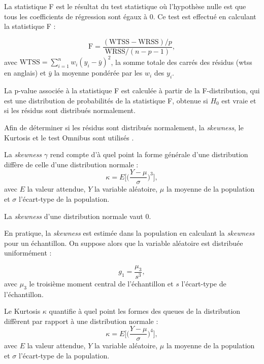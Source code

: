 La statistique F est le résultat du test statistique où l'hypothèse nulle est que tous les coefficients de régression sont égaux à 0. Ce test est effectué en calculant 
la statistique F \citep{James2013} :

\begin{equation}
\label{eq:factors_statistic_F}
\text{F} = \frac{ (\text{WTSS} - \text{WRSS}) / p }{ \text{WRSS} /(n - p - 1) }, 
\end{equation}
avec $\text{WTSS} = \sum_{i=1}^{n} w_i(y_i - \bar{y})^2$, la somme totale des carrés des résidus (\gls{wtss} en anglais) et $\bar{y}$ la moyenne 
pondérée par les $w_i$ des $y_i$. 

La p-value associée à la statistique F est calculée à partir de la F-distribution, qui est une distribution de probabilités de la statistique F, obtenue si $H_{0}$ 
est vraie et si les résidus sont distribués normalement.

Afin de déterminer si les résidus sont distribués normalement, la \textit{skewness}, le Kurtosis et le test Omnibus sont utilisés \citep{dagostino1973, dagostino1971, Bowman1975}.

La \textit{skewness} $\gamma$ rend compte d'à quel point la forme générale d'une distribution diffère de celle d'une distribution normale : 
\begin{equation}
\label{eq:factors_skewness}
\kappa = E \Big[ \Big(\frac{ Y - \mu }{ \sigma }\Big)^{3} \Big], 
\end{equation}
avec $E$ la valeur attendue, $Y$ la variable aléatoire, $\mu$ la moyenne de la population et $\sigma$ l'écart-type de la population.

La \textit{skewness} d'une distribution normale vaut 0.

En pratique, la \textit{skewness} est estimée dans la population en calculant la \textit{skewness} pour un échantillon. On suppose alors
que la variable aléatoire est distribuée uniformément :

\begin{equation}
\label{eq:factors_skewness_estimation}
g_{1} = \frac{ \mu_{3} } {s^3},
\end{equation}
avec $\mu_{3}$ le troisième moment central de l'échantillon et $s$ l'écart-type de l'échantillon.

Le Kurtosis $\kappa$ quantifie à quel point les formes des queues de la distribution diffèrent par rapport à une distribution normale :
\begin{equation}
\label{eq:factors_kurtosis}
\kappa = E \Big[ \Big(\frac{ Y - \mu }{ \sigma }\Big)^{4} \Big], 
\end{equation}
avec $E$ la valeur attendue, $Y$ la variable aléatoire, $\mu$ la moyenne de la population et $\sigma$ l'écart-type de la population.

